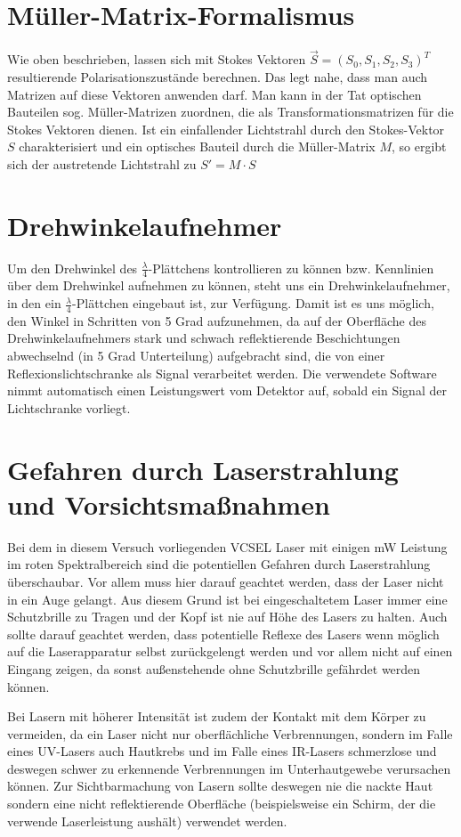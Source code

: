 \documentclass[bigchapter,colorback,accentcolor=tud4b,linedtoc,11pt]{tudreport}
\begin{document}
\section{Müller-Matrix-Formalismus}
Wie oben beschrieben, lassen sich mit Stokes Vektoren $\vec{S}= (S_0, S_1, S_2, S_3)^T$ resultierende Polarisationszustände berechnen. Das legt nahe, dass man auch Matrizen auf diese Vektoren anwenden darf. Man kann in der Tat optischen Bauteilen sog. Müller-Matrizen zuordnen, die als Transformationsmatrizen für die Stokes Vektoren dienen. Ist ein einfallender Lichtstrahl durch den Stokes-Vektor $S$ charakterisiert und ein optisches Bauteil durch die Müller-Matrix $M$, so ergibt sich der austretende Lichtstrahl zu $S' = M \cdot S$ 

\section{Drehwinkelaufnehmer}
Um den Drehwinkel des $\frac{\lambda}{4}$-Plättchens kontrollieren zu können bzw. Kennlinien über dem Drehwinkel aufnehmen zu können, steht uns ein Drehwinkelaufnehmer, in den ein $\frac{\lambda}{4}$-Plättchen eingebaut ist, zur Verfügung. Damit ist es uns möglich, den Winkel in Schritten von 5 Grad aufzunehmen, da auf der Oberfläche des Drehwinkelaufnehmers stark und schwach reflektierende Beschichtungen abwechselnd (in 5 Grad Unterteilung) aufgebracht sind, die von einer Reflexionslichtschranke als Signal verarbeitet werden. Die verwendete Software nimmt automatisch einen Leistungswert vom Detektor auf, sobald ein Signal der Lichtschranke vorliegt. 


\section{Gefahren durch Laserstrahlung und Vorsichtsmaßnahmen}
Bei dem in diesem Versuch vorliegenden VCSEL Laser mit einigen mW Leistung im roten Spektralbereich sind die potentiellen Gefahren durch Laserstrahlung überschaubar. Vor allem muss hier darauf geachtet werden, dass der Laser nicht in ein Auge gelangt. Aus diesem Grund ist bei eingeschaltetem Laser immer eine Schutzbrille zu Tragen und der Kopf ist nie auf Höhe des Lasers zu halten. Auch sollte darauf geachtet werden, dass potentielle Reflexe des Lasers wenn möglich auf die Laserapparatur selbst zurückgelengt werden und vor allem nicht auf einen Eingang zeigen, da sonst außenstehende ohne Schutzbrille gefährdet werden können.

Bei Lasern mit höherer Intensität ist zudem der Kontakt mit dem Körper zu vermeiden, da ein Laser nicht nur oberflächliche Verbrennungen, sondern im Falle eines UV-Lasers auch Hautkrebs und im Falle eines IR-Lasers schmerzlose und deswegen schwer zu erkennende Verbrennungen im Unterhautgewebe verursachen können. Zur Sichtbarmachung von Lasern sollte deswegen nie die nackte Haut sondern eine nicht reflektierende Oberfläche (beispielsweise ein Schirm, der die verwende Laserleistung aushält) verwendet werden.
\end{document}
